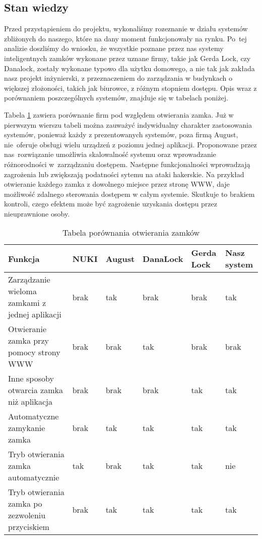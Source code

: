 \subsection{Stan wiedzy}\label{sec:Stan wiedzy}
Przed przystąpieniem do projektu, wykonaliśmy rozeznanie w działu systemów zbliżonych do naszego, które na dany moment funkcjonowały na rynku. Po~tej analizie doszliśmy do wniosku, że wszystkie poznane przez nas systemy inteligentnych zamków wykonane przez uznane firmy, takie jak Gerda Lock, czy Danalock, zostały wykonane typowo dla użytku domowego, a nie tak jak zakłada nasz projekt inżynierski, z  przeznaczeniem do zarządzania w budynkach o większej złożoności, takich jak biurowce, z różnym stopniem dostępu. Opis wraz z porównaniem poszczególnych systemów, znajduje się w tabelach poniżej.

Tabela \ref{tab:porownanie1} zawiera porównanie firm pod względem otwierania zamka. Już w pierwszym wierszu tabeli można zauważyć indywidualny charakter zastosowania systemów, ponieważ każdy z prezentowanych systemów, poza firmą August, nie~oferuje obsługi wielu urządzeń z poziomu jednej aplikacji. Proponowane przez nas~rozwiązanie umożliwia skalowalność systemu oraz wprowadzanie różnorodności w~zarządzaniu dostępem. Następne funkcjonalności wprowadzają zagrożenia lub zwiększają podatności sytemu na ataki hakerskie. Na przykład otwieranie każdego zamka z dowolnego miejsce przez stronę WWW, daje możliwość zdalnego sterowania dostępem w całym systemie. Skutkuje to brakiem kontroli, czego efektem może być zagrożenie uzyskania dostępu przez nieuprawnione osoby.
\newpage
	\begin{longtable}[!ht]{|m{5cm}|m{1.5cm}|m{1.6cm}|m{1.9cm}|m{2cm}|m{2cm}|} 
		\caption{Tabela porównania otwierania zamków}
		\label{tab:porownanie1}\\
		\hline	
		Funkcja & NUKI\cite{NUKI} & August\cite{August} & DanaLock\cite{DanaLock} &
		 Gerda Lock\cite{GerdaLock} & 
		 Nasz system  \\	\hline
		 Zarządzanie wieloma zamkami z jednej aplikacji
		 & brak & tak & brak & brak & tak \\	\hline
		Otwieranie zamka przy pomocy strony WWW
		& brak & brak & tak & brak & brak \\	\hline
		Inne sposoby otwarcia zamka niż aplikacja
		& brak & brak & brak & tak & tak \\	\hline
		Automatyczne zamykanie zamka
		& brak & tak & tak & tak & tak \\	\hline
		Tryb otwierania zamka automatycznie
		& tak& brak & tak & tak & nie \\	\hline	
		Tryb otwierania zamka po zezwoleniu przyciskiem
		& brak & tak & tak & tak & tak \\		\hline
	\end{longtable}

